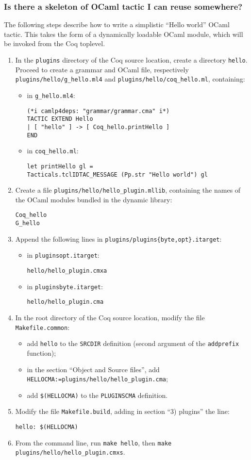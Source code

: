 \documentclass[a4paper,pdftex]{article}
\def\Question#1{\stepcounter{question}\subsubsection{#1}}
\begin{document}
\Question{Is there a skeleton of OCaml tactic I can reuse somewhere?}

The following steps describe how to write a simplistic ``Hello world'' OCaml
tactic. This takes the form of a dynamically loadable OCaml module, which will
be invoked from the Coq toplevel.
\begin{enumerate}
\item In the \verb+plugins+ directory of the Coq source location, create a
directory \verb+hello+. Proceed to create a grammar and OCaml file, respectively
\verb+plugins/hello/g_hello.ml4+ and \verb+plugins/hello/coq_hello.ml+,
containing:
  \begin{itemize}
  \item in \verb+g_hello.ml4+:
\begin{verbatim}
(*i camlp4deps: "grammar/grammar.cma" i*)
TACTIC EXTEND Hello
| [ "hello" ] -> [ Coq_hello.printHello ]
END
\end{verbatim}
  \item in \verb+coq_hello.ml+:
\begin{verbatim}
let printHello gl =
Tacticals.tclIDTAC_MESSAGE (Pp.str "Hello world") gl
  \end{verbatim}
  \end{itemize}
\item Create a file \verb+plugins/hello/hello_plugin.mllib+, containing the
names of the OCaml modules bundled in the dynamic library:
\begin{verbatim}
Coq_hello
G_hello
\end{verbatim}
\item Append the following lines in \verb+plugins/plugins{byte,opt}.itarget+:
\begin{itemize}
  \item in \verb+pluginsopt.itarget+:
\begin{verbatim}
hello/hello_plugin.cmxa
\end{verbatim}
  \item in \verb+pluginsbyte.itarget+:
\begin{verbatim}
hello/hello_plugin.cma
\end{verbatim}
\end{itemize}
\item In the root directory of the Coq source location, modify the file
\verb+Makefile.common+:
  \begin{itemize}
  \item add \verb+hello+ to the \verb+SRCDIR+ definition (second argument of the
  \verb+addprefix+ function);
  \item in the section ``Object and Source files'', add \verb+HELLOCMA:=plugins/hello/hello_plugin.cma+;
  \item add \verb+$(HELLOCMA)+ to the \verb+PLUGINSCMA+ definition.
  \end{itemize}
\item Modify the file \verb+Makefile.build+, adding in section ``3) plugins'' the
line:
\begin{verbatim}
hello: $(HELLOCMA)
\end{verbatim}
\item From the command line, run \verb+make hello+, then \verb+make plugins/hello/hello_plugin.cmxs+.
\end{enumerate}
\end{document}
